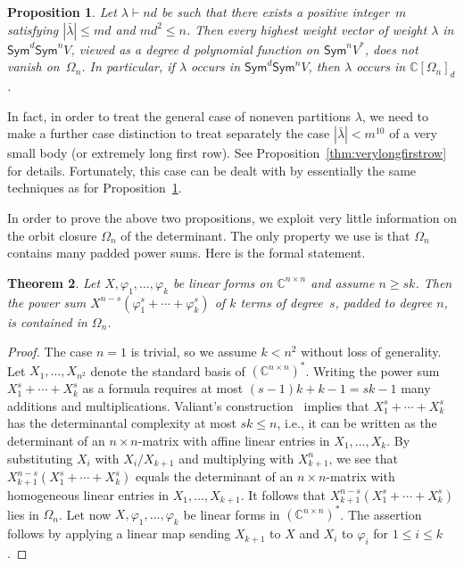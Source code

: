 \documentclass[11pt]{amsart}
\def\C{\mathbb{C}}
\def\Sym{\mathsf{Sym}}
\newcommand{\Det}{\Omega}
\def\la{\lambda}
\newcommand{\IC}{\ensuremath{\mathbb{C}}}
\numberwithin{equation}{section}
\newtheorem{theorem}{Theorem}[section]
\newtheorem{proposition}[theorem]{Proposition}
\begin{document}
\begin{proposition}\label{pro:I-degreebound}
Let $\la \vdash nd$ be such that there exists a positive integer~$m$ satisfying 
$|\bar{\la}| \le md$ and $md^2\le n$. 
Then {\em every} highest weight vector of weight $\la$ in 
$\Sym^d\Sym^n V$,
viewed as a degree $d$ polynomial function on  $\Sym^n V^*$,
does not vanish on~$\Det_n$. In particular, 
if $\lambda$ occurs in $\Sym^d\Sym^n V$, 
then $\lambda$ occurs in $\IC[\Det_n]_d$.
\end{proposition}

In fact, in order to treat the general case of noneven partitions $\la$, 
we need to make a further case distinction to treat separately 
the case $|\bar\la| < m^{10}$ of a very small body (or extremely long first row).   
See  Proposition~\ref{thm:verylongfirstrow} for details. Fortunately, this case can be 
dealt with by essentially the same techniques as for 
Proposition~\ref{pro:I-degreebound}. 



In order to prove the above two propositions, we exploit very little information 
on the orbit closure $\Det_n$ of the determinant. 
The only property we use is that $\Det_n$ contains many padded power sums. 
Here is the formal statement. 

\begin{theorem}\label{eq:I-containlinforms} 
Let $X,\varphi_1,\ldots,\varphi_k$ be linear forms on $\C^{n\times n}$ and assume $n \geq sk$. 
Then the power sum 
$X^{n-s} (\varphi_1^{s}+\cdots+\varphi_k^s)$
of $k$ terms of degree~$s$, padded to degree $n$, is contained in $\Det_n$.
\end{theorem}

\begin{proof} 
The case $n=1$ is trivial, so we assume $k<n^2$ without loss of generality.  
Let $X_1,\ldots,X_{n^2}$ denote the standard basis of $(\C^{n\times n})^*$.
Writing the power sum $X_1^s+\cdots+X_k^s$ as a formula requires at most 
$(s-1)k + k - 1 = sk - 1$ many additions and multiplications.
Valiant's construction~\cite{Val:79a} implies that 
$X_1^s+\cdots+X_k^s$ has the determinantal complexity at most $sk\le n$, 
i.e., it can be written as the determinant of an $n\times n$-matrix 
with affine linear entries in $X_1,\ldots,X_k$. 
By substituting $X_i$ with $X_i/X_{k+1}$ and multiplying with $X_{k+1}^{n}$,  
we see that 
$X_{k+1}^{n-s}(X_1^s+\cdots+X_k^s)$
equals the determinant of an $n\times n$-matrix 
with homogeneous linear entries in $X_1,\ldots,X_{k+1}$. 
It follows that 
$X_{k+1}^{n-s}(X_1^s+\cdots+X_k^s)$ lies in $\Det_n$. 
Let now 
$X,\varphi_1,\ldots,\varphi_k$ be linear forms in $(\C^{n\times n})^*$. 
The assertion follows by 
applying a linear map sending $X_{k+1}$ to $X$ and 
$X_i$ to $\varphi_i$ for $1\le i\le k$. 
\end{proof}
\end{document}
